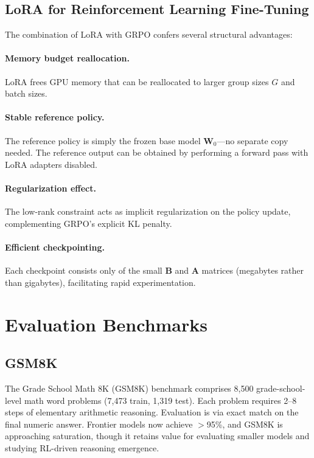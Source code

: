 \documentclass[12pt,a4paper]{report}
\theoremstyle{definition}
\begin{document}
\subsection{LoRA for Reinforcement Learning Fine-Tuning}

The combination of LoRA with GRPO confers several structural advantages:

\paragraph{Memory budget reallocation.} LoRA frees GPU memory that can be reallocated to larger group sizes $G$ and batch sizes.

\paragraph{Stable reference policy.} The reference policy is simply the frozen base model $\mathbf{W}_0$---no separate copy needed. The reference output can be obtained by performing a forward pass with LoRA adapters disabled.

\paragraph{Regularization effect.} The low-rank constraint acts as implicit regularization on the policy update, complementing GRPO's explicit KL penalty.

\paragraph{Efficient checkpointing.} Each checkpoint consists only of the small $\mathbf{B}$ and $\mathbf{A}$ matrices (megabytes rather than gigabytes), facilitating rapid experimentation.


\section{Evaluation Benchmarks}
\label{sec:math-benchmarks}

\subsection{GSM8K}

The Grade School Math 8K (GSM8K) benchmark \cite{cobbe2021gsm8k} comprises 8,500 grade-school-level math word problems (7,473 train, 1,319 test). Each problem requires 2--8 steps of elementary arithmetic reasoning. Evaluation is via exact match on the final numeric answer. Frontier models now achieve $>$95\%, and GSM8K is approaching saturation, though it retains value for evaluating smaller models and studying RL-driven reasoning emergence.
\end{document}
